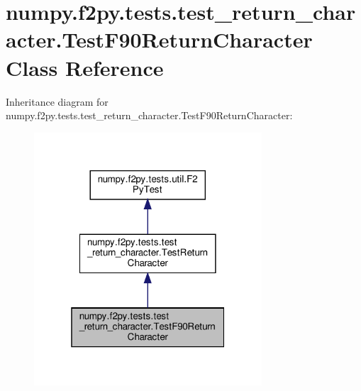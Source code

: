 \hypertarget{classnumpy_1_1f2py_1_1tests_1_1test__return__character_1_1TestF90ReturnCharacter}{}\section{numpy.\+f2py.\+tests.\+test\+\_\+return\+\_\+character.\+Test\+F90\+Return\+Character Class Reference}
\label{classnumpy_1_1f2py_1_1tests_1_1test__return__character_1_1TestF90ReturnCharacter}


Inheritance diagram for numpy.\+f2py.\+tests.\+test\+\_\+return\+\_\+character.\+Test\+F90\+Return\+Character\+:
\nopagebreak
\begin{figure}[H]
\begin{center}
\leavevmode
\includegraphics[width=241pt]{classnumpy_1_1f2py_1_1tests_1_1test__return__character_1_1TestF90ReturnCharacter__inherit__graph}
\end{center}
\end{figure}


